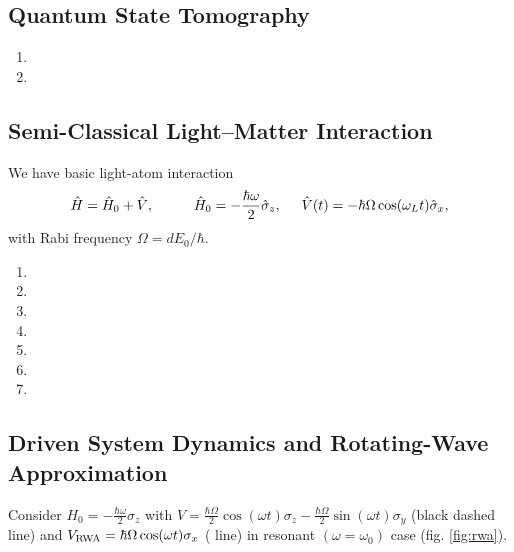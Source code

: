 \subsection{Quantum State Tomography}

\begin{enumerate}[label=(\alph*)]
	\item 
	\item 
\end{enumerate}


\subsection{Semi-Classical Light–Matter Interaction}

We have basic light-atom interaction
\begin{equation*}
	\hat{H} = \hat{H}_0 + \hat{V}
	,
	\hspace{10 mm} 
	\hat{H}_0 = - \frac{\hbar \omega}{2} \hat{\sigma}_z,
	\hspace{5 mm} 
	\hat{V}(t) = - \hbar \Omega \cos(\omega_L t) \hat{\sigma}_x,
\end{equation*}
with Rabi frequency $\Omega = d E_0 / \hbar$.

\begin{enumerate}[label=(\alph*)]
	\item 
	\item 
	\item 
	\item 
	\item 
	\item 
	\item 
\end{enumerate}



\subsection{Driven System Dynamics and Rotating-Wave Approximation}

Consider $H_0 = - \frac{\hbar \omega}{2} \sigma_z$ with $V = \frac{\hbar\Omega}{2}\cos(\omega t) \sigma_z - \frac{\hbar\Omega}{2} \sin(\omega t) \sigma_y $ (black dashed line) and $V_{\textnormal{RWA}} = \hbar \Omega \cos(\omega t) \sigma_x$ ( line) in resonant $(\omega=\omega_0)$ case (fig. \ref{fig:rwa}).

